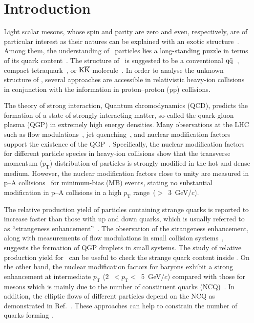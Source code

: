 
\section{Introduction}

Light scalar mesons, whose spin and parity are zero and even, respectively, are of particular interest as their natures can be explained with an exotic structure~\cite{ParticleDataGroup:2022pth}. Among them, the understanding of \fzero\ particles lies a long-standing puzzle in terms of its quark content~\cite{ExHIC:2010gcb, Jaffe:1976ig, Maiani:2004uc}. The structure of \fzero\ is suggested to be a conventional $\rm{}q\bar{q}$~\cite{Chen:2003za}, compact tetraquark~\cite{Achasov:2020aun}, or $\rm{}K\overline{K}$ molecule~\cite{Ahmed:2020kmp}. In order to analyse the unknown structure of \fzero, several approaches are accessible in relativistic heavy-ion collisions in conjunction with the information in proton--proton (pp) collisions. 

The theory of strong interaction, Quantum chromodynamics (QCD), predicts the formation of a state of strongly interacting matter, so-called the quark-gluon plasma (QGP) in extremely high energy densities. 
Many observations at the LHC such as flow modulations~\cite{Bhalerao:2020ulk, ALICE:2019zfl}, jet quenching~\cite{ALICE:2019qyj}, and nuclear modification factors~\cite{ALICE:2019hno} support the existence of the QGP~\cite{Adams:2005dq}. 
Specifically, the nuclear modification factors for different particle species in heavy-ion collisions show that the transverse momentum ($p_{\mathrm{T}}$) distribution of particles is strongly modified in the hot and dense medium. However, the nuclear modification factors close to unity are measured in p--A collisions~\cite{ALICE:2016dei} for minimum-bias (MB) events, stating no substantial modification in p--A collisions in a high $p_{\mathrm{T}}$ range~($>$~3~GeV/$c$). 

The relative production yield of particles containing strange quarks is reported to increase faster than those with up and down quarks, which is usually referred to as ``strangeness enhancement''~\cite{ALICE:2016fzo}. The observation of the strangeness enhancement, along with measurements of flow modulations in small collision systems~\cite{PHENIX:2018lia, ALICE:2021nir}, suggests the formation of QGP droplets in small systems. The study of relative production yield for \fzero\ can be useful to check the strange quark content inside \fzero. On the other hand, the nuclear modification factors for baryons exhibit a strong enhancement at intermediate $p_{\mathrm{T}}$ (2~$<p_{\mathrm{T}}<$~5~GeV/$c$) compared with those for mesons which is mainly due to the number of constituent quarks (NCQ)~\cite{Cronin:1974zm, Fries:2003vb}. In addition, the elliptic flows of different particles depend on the NCQ as demonstrated in Ref.~\cite{Wang:2022det}. These approaches can help to constrain the number of quarks forming \fzero.

